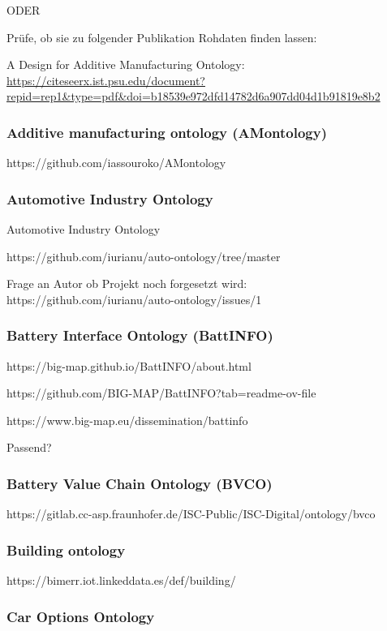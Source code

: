 \documentclass{article}
\begin{document}
ODER

Prüfe, ob sie zu folgender Publikation Rohdaten finden lassen:

A Design for Additive Manufacturing Ontology:
\url{https://citeseerx.ist.psu.edu/document?repid=rep1&type=pdf&doi=b18539e972dfd14782d6a907dd04d1b91819e8b2}

\subsubsection{Additive manufacturing ontology (AMontology)}

https://github.com/iassouroko/AMontology

\subsubsection{Automotive Industry Ontology}

Automotive Industry Ontology

https://github.com/iurianu/auto-ontology/tree/master

Frage an Autor ob Projekt noch forgesetzt wird: https://github.com/iurianu/auto-ontology/issues/1

\subsubsection{Battery Interface Ontology (BattINFO)}

https://big-map.github.io/BattINFO/about.html

https://github.com/BIG-MAP/BattINFO?tab=readme-ov-file

https://www.big-map.eu/dissemination/battinfo

Passend?

\subsubsection{Battery Value Chain Ontology (BVCO)}

https://gitlab.cc-asp.fraunhofer.de/ISC-Public/ISC-Digital/ontology/bvco

\subsubsection{Building ontology}

https://bimerr.iot.linkeddata.es/def/building/

\subsubsection{Car Options Ontology}
\end{document}
